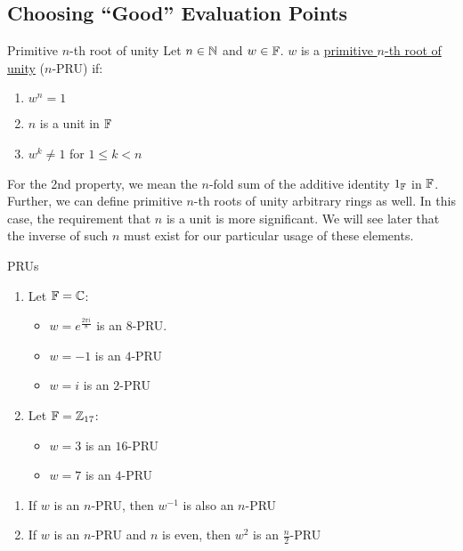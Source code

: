 \subsection{Choosing ``Good'' Evaluation Points}
\begin{definition}{Primitive $n$-th root of unity}{}
    Let $n \in \operatorname{\mathbb{N}}$ and $w \in \operatorname{\mathbb{F}}$. $w$ is a \underline{primitive $n$-th root of unity} ($n$-PRU) if:
    \begin{enumerate}
        \item $w^n = 1$
        \item $n$ is a unit in $\operatorname{\mathbb{F}}$
        \item $w^k \neq 1$ for $1 \leq k < n$
    \end{enumerate}
\end{definition}
\begin{remark}
    For the 2nd property, we mean the $n$-fold sum of the additive identity $1_{\operatorname{\mathbb{F}}}$ in $\operatorname{\mathbb{F}}$.
    Further, we can define primitive $n$-th roots of unity arbitrary rings as well.
    In this case, the requirement that $n$ is a unit is more significant.
    We will see later that the inverse of such $n$ must exist for our particular usage of these elements.
\end{remark}

\begin{example}{PRUs}{}
    \begin{enumerate}
        \item Let $\operatorname{\mathbb{F}} = \operatorname{\mathbb{C}}$:
        \begin{itemize}
            \item $w = e^{\frac{2\pi i}{8}}$ is an $8$-PRU.
            \item $w = -1$ is an $4$-PRU
            \item $w = i$ is an $2$-PRU
        \end{itemize}

        \item Let $\operatorname{\mathbb{F}} = \operatorname{\mathbb{Z}}_{17}$:
        \begin{itemize}
            \item $w = 3$ is an $16$-PRU
            \item $w = 7$ is an $4$-PRU
        \end{itemize}
    \end{enumerate}
\end{example}

\begin{proposition}{}{}
    \begin{enumerate}
        \item If $w$ is an $n$-PRU, then $w^{-1}$ is also an $n$-PRU
        \item If $w$ is an $n$-PRU and $n$ is even, then $w^2$ is an $\frac{n}{2}$-PRU
    \end{enumerate}
\end{proposition}

